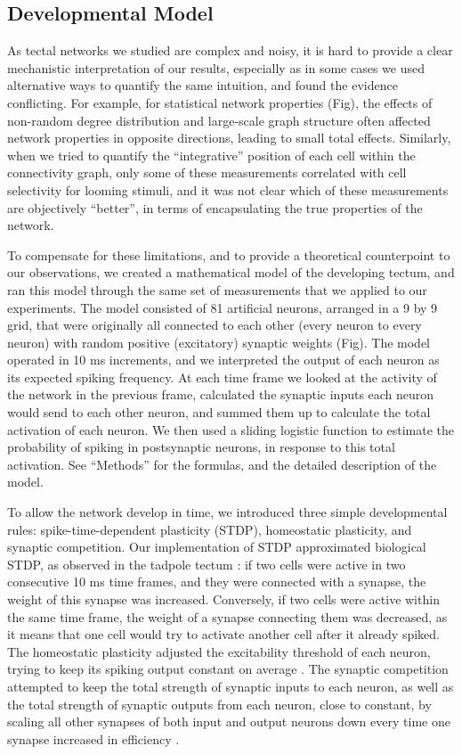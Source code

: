 \documentclass{article}
\begin{document}
\subsection*{Developmental Model}

As tectal networks we studied are complex and noisy, it is hard to provide a clear mechanistic interpretation of our results, especially as in some cases we used alternative ways to quantify the same intuition, and found the evidence conflicting. For example, for statistical network properties (Fig), the effects of non-random degree distribution and large-scale graph structure often affected network properties in opposite directions, leading to small total effects. Similarly, when we tried to quantify the “integrative” position of each cell within the connectivity graph, only some of these measurements correlated with cell selectivity for looming stimuli, and it was not clear which of these measurements are objectively “better”, in terms of encapsulating the true properties of the network.

To compensate for these limitations, and to provide a theoretical counterpoint to our observations, we created a mathematical model of the developing tectum, and ran this model through the same set of measurements that we applied to our experiments. The model consisted of 81 artificial neurons, arranged in a 9 by 9 grid, that were originally all connected to each other (every neuron to every neuron) with random positive (excitatory) synaptic weights (Fig). The model operated in 10 ms increments, and we interpreted the output of each neuron as its expected spiking frequency. At each time frame we looked at the activity of the network in the previous frame, calculated the synaptic inputs each neuron would send to each other neuron, and summed them up to calculate the total activation of each neuron. We then used a sliding logistic function to estimate the probability of spiking in postsynaptic neurons, in response to this total activation. See “Methods” for the formulas, and the detailed description of the model.

To allow the network develop in time, we introduced three simple developmental rules: spike-time-dependent plasticity (STDP), homeostatic plasticity, and synaptic competition. Our implementation of STDP approximated biological STDP, as observed in the tadpole tectum \citep{zhang1998stdp,mu2006stdp}: if two cells were active in two consecutive 10 ms time frames, and they were connected with a synapse, the weight of this synapse was increased. Conversely, if two cells were active within the same time frame, the weight of a synapse connecting them was decreased, as it means that one cell would try to activate another cell after it already spiked. The homeostatic plasticity adjusted the excitability threshold of each neuron, trying to keep its spiking output constant on average \citep{pratt2007intrinsic,turrigiano2011}. The synaptic competition attempted to keep the total strength of synaptic inputs to each neuron, as well as the total strength of synaptic outputs from each neuron, close to constant, by scaling all other synapses of both input and output neurons down every time one synapse increased in efficiency \citep{hamodi2016nmda,cohen2002synreview,munz2014hebbian}.
\end{document}
